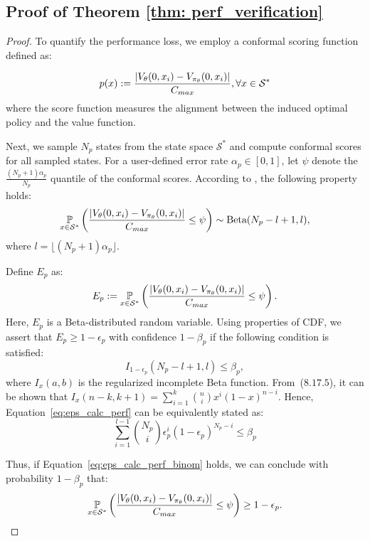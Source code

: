 \subsection{Proof of Theorem \eqref{thm: perf_verification}}\label{appendix: proof_perf}
\begin{proof}
    To quantify the performance loss, we employ a conformal scoring function defined as:

\begin{equation*}
    p(x) := \frac{|V_{\theta}(0, x_i) - V_{\pi_{\theta}}(0, x_i)|}{C_{max}}, \forall x \in \mathcal{S}^*
\end{equation*}
where the score function measures the alignment between the induced optimal policy and the value function.

Next, we sample \( N_p \) states from the state space \( \mathcal{S}^* \) and compute conformal scores for all sampled states. For a user-defined error rate \( \alpha_p \in [0, 1] \), let \( \psi \) denote the \(\frac{(N_p+1)\alpha_p}{N_p}\) quantile of the conformal scores. According to \cite{vovk2012}, the following property holds:
\[
\underset{x \in \mathcal{S}^*}{\mathbb{P}}\left(\frac{|V_{\theta}(0, x_i) - V_{\pi_{\theta}}(0, x_i)|}{C_{max}} \leq \psi \right) \sim \text{Beta}(N_p - l + 1, l),
\]
where \( l = \lfloor (N_p+1)\alpha_p \rfloor \).

Define \( E_p \) as:
\[
E_p := \underset{x \in \mathcal{S}^*}{\mathbb{P}}\left(\frac{|V_{\theta}(0, x_i) - V_{\pi_{\theta}}(0, x_i)|}{C_{max}} \leq \psi\right).
\]
Here, \( E_p \) is a Beta-distributed random variable. Using properties of CDF, we assert that \( E_p \geq 1 - \epsilon_p \) with confidence \( 1 - \beta_p \) if the following condition is satisfied:
\begin{equation} \label{eq:eps_calc_perf}
    I_{1-\epsilon_p}(N_p - l + 1, l) \leq \beta_p,
\end{equation}
where \( I_x(a,b) \) is the regularized incomplete Beta function. From~\cite{DLMF}($8.17.5$), it can be shown that $I_x(n-k, k+1) = \sum_{i=1}^{k} \binom{n}{i} x^i (1 - x)^{n - i}$. Hence, Equation~\eqref{eq:eps_calc_perf} can be equivalently stated as:
\begin{equation} \label{eq:eps_calc_perf_binom}
    \sum_{i=1}^{l-1} \binom{N_p}{i} \epsilon_p^i (1 - \epsilon_p)^{N_p - i} \leq \beta_p
\end{equation}

Thus, if Equation~\eqref{eq:eps_calc_perf_binom} holds, we can conclude with probability \( 1-\beta_p \) that:
\[
\underset{x \in \mathcal{S}^*}{\mathbb{P}}\left(\frac{|V_{\theta}(0, x_i) - V_{\pi_{\theta}}(0, x_i)|}{C_{max}} \leq \psi \right) \geq 1-\epsilon_p.
\]
\end{proof}

